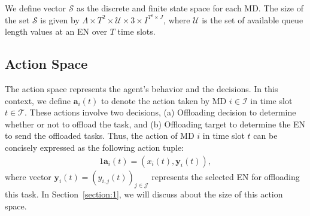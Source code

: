 \documentclass[10pt, journal,letterpaper]{IEEEtran}
\begin{document}
We define vector $\mathcal{S}$ as the discrete and finite state space for each MD. The size of the set $\mathcal{S}$ is given by $\Lambda \times T^2 \times \mathcal{U} \times 3 \times I^{T^{\text{s}} \times J}$, where $\mathcal{U}$ is the set of available queue length values at an EN over $T$ time slots. 








\subsection{Action Space}
The action space represents the agent's behavior and the decisions. In this context, we define $\boldsymbol{a}_i(t)$ to denote the action taken by MD $i \in \mathcal{I}$ in time slot $t \in \mathcal{T}$. These actions involve two decisions, (a) Offloading decision to determine whether or not to offload the task, and (b) Offloading target to determine the EN to send the offloaded tasks. Thus, the action of MD $i$ in time slot $t$ can be concisely expressed as the following action tuple: \vspace{-1.5mm}
\begin{alignat}{1}
	\boldsymbol{a}_i(t) = (x_i(t), \boldsymbol{y}_i(t)),
	\label{20}
\end{alignat}
where vector $\boldsymbol{y}_i(t)=(y_{i,j}(t))_{j \in \mathcal{J}}$ represents the selected EN for offloading this task. In Section~\ref{section:1}, we will discuss about the size of this action space.

\end{document}
